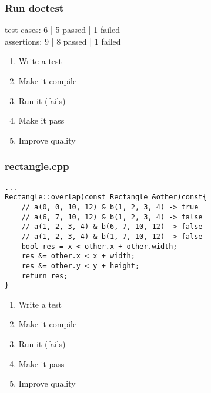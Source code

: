 \begin{frame}[fragile]
\frametitle{Run doctest}
\begin{minipage}[t]{0.48\linewidth}
test cases: 6 | 5 passed | 1 failed\\
assertions: 9 | 8 passed | 1 failed\\
\end{minipage}\hfill
\begin{minipage}[t]{0.28\linewidth}
  \small
  \begin{enumerate} 
    \item \textcolor{deadcolor}{Write a test}
    \item \textcolor{deadcolor}{Make it compile}
    \item \textcolor{activecolor}{Run it (fails)}
    \item \textcolor{deadcolor}{Make it pass}
    \item \textcolor{deadcolor}{Improve quality}
  \end{enumerate} 
\end{minipage}
\end{frame}

\begin{frame}[fragile]
\frametitle{rectangle.cpp}
\begin{minipage}[t]{0.48\linewidth}
\begin{lstlisting}
...
Rectangle::overlap(const Rectangle &other)const{
    // a(0, 0, 10, 12) & b(1, 2, 3, 4) -> true
    // a(6, 7, 10, 12) & b(1, 2, 3, 4) -> false
    // a(1, 2, 3, 4) & b(6, 7, 10, 12) -> false
    // a(1, 2, 3, 4) & b(1, 7, 10, 12) -> false
    bool res = x < other.x + other.width;
    res &= other.x < x + width;
    res &= other.y < y + height;
    return res;
}
\end{lstlisting}
\end{minipage}\hfill
\begin{minipage}[t]{0.28\linewidth}
  \small
  \begin{enumerate} 
    \item \textcolor{deadcolor}{Write a test}
    \item \textcolor{deadcolor}{Make it compile}
    \item \textcolor{deadcolor}{Run it (fails)}
    \item \textcolor{activecolor}{Make it pass}
    \item \textcolor{deadcolor}{Improve quality}
  \end{enumerate} 
\end{minipage}
\end{frame}


